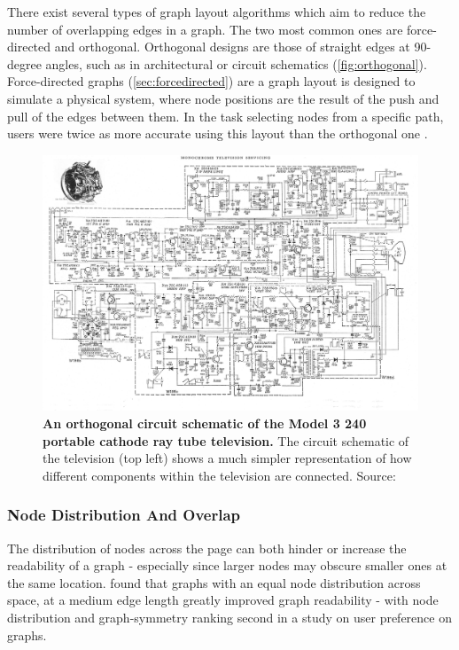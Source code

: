There exist several types of graph layout algorithms which aim to reduce the number of overlapping edges in a graph. The two most common ones are force-directed and orthogonal. Orthogonal designs are those of straight edges at 90-degree angles, such as in architectural or circuit schematics (\autoref{fig:orthogonal}). Force-directed graphs (\autoref{sec:forcedirected}) are a graph layout is designed to simulate a physical system, where node positions are the result of the push and pull of the edges between them. In the task selecting nodes from a specific path, users were twice as more accurate using this layout than the orthogonal one \citep{eyetrack}.


\begin{figure}[H]
    \centering
        \includegraphics[width=\textwidth]{tvschematic.jpg}
       \caption{\textbf{An orthogonal circuit schematic of the Model 3 240 portable cathode ray tube television.} The circuit schematic of the television (top left) shows a much simpler representation of how different components within the television are connected.  Source: \citep{orthogonaltv} }
       \label{fig:orthogonal}
\end{figure}





\subsubsection{Node Distribution And Overlap}\label{sec:ndist}

The distribution of nodes across the page can both hinder or increase the readability of a graph - especially since larger nodes may obscure smaller ones at the same location. \cite{ch6graphredability} found that graphs with an equal node distribution across space, at a medium edge length greatly improved graph readability - with node distribution and graph-symmetry ranking second in a study on user preference on graphs.

